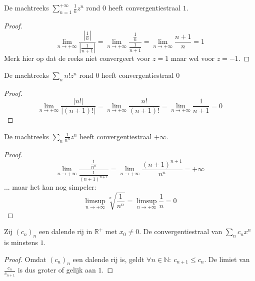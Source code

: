 \documentclass[main.tex]{subfiles}
\begin{document}
\begin{vb}
  De machtreeks $\sum_{n=1}^{+\infty}\frac{1}{n}z^{n}$ rond $0$ heeft convergentiestraal $1$.

  \begin{proof}
    \[
    \lim_{n\rightarrow +\infty}\frac{\left|\frac{1}{n}\right|}{\left|\frac{1}{n+1}\right|} 
    = \lim_{n\rightarrow +\infty}\frac{\frac{1}{n}}{\frac{1}{n+1}} 
    = \lim_{n\rightarrow +\infty} \frac{n+1}{n} = 1
    \]
    Merk hier op dat de reeks niet convergeert voor $z=1$ maar wel voor $z=-1$.
  \end{proof}
\end{vb}

\begin{vb}
  De machtreeks $\sum_{n}n!z^{n}$ rond $0$ heeft convergentiestraal $0$
  
  \begin{proof}
    \[
    \lim_{n\rightarrow +\infty}\frac{\left|n!\right|}{\left| (n+1)!\right|}
    = \lim_{n\rightarrow +\infty}\frac{n!}{(n+1)!}
    = \lim_{n\rightarrow +\infty}\frac{1}{n+1}
    = 0
    \]
  \end{proof}
\end{vb}

\begin{vb}
  De machtreeks $\sum_{n}\frac{1}{n^{n}}z^{n}$ heeft convergentiestraal $+\infty$.
  
  \begin{proof}
    \[
    \lim_{n \rightarrow +\infty} \frac{\frac{1}{n^{n}}}{\frac{1}{(n+1)^{n+1}}}
    = \lim_{n \rightarrow +\infty}\frac{(n+1)^{n+1}}{n^{n}}
    = +\infty
    \]
    ... maar het kan nog simpeler:
    \[ \limsup_{n\rightarrow +\infty}\sqrt[n]{\frac{1}{n^{n}}} = \limsup_{n\rightarrow +\infty}\frac{1}{n} = 0 \]
  \end{proof}
\end{vb}

\begin{st}
  Zij $(c_{n})_{n}$ een dalende rij in $\mathbb{R}^{+}$ met $x_{0} \neq 0$.
  De convergentiestraal van $\sum_{n}c_{n}x^{n}$ is minstens $1$.

  \begin{proof}
    Omdat $(c_{n})_{n}$ een dalende rij is, geldt $\forall n\in\mathbb{N}:\ c_{n+1} \le c_{n}$.
    De limiet van $\frac{c_{n}}{c_{n+1}}$ is dus groter of gelijk aan $1$.
  \end{proof}
\end{st}
\end{document}

